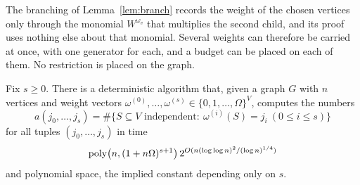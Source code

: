 The branching of Lemma~\ref{lem:branch} records the weight of the chosen
vertices only through the monomial $W^{\omega_v}$ that multiplies the second
child, and its proof uses nothing else about that monomial. Several weights can
therefore be carried at once, with one generator for each, and a budget can be
placed on each of them. No restriction is placed on the graph.

\begin{theorem}\label{thm:indepbudget}
Fix $s\ge0$. There is a deterministic algorithm that, given a graph $G$ with $n$
vertices and weight vectors $\omega^{(0)},\dots,\omega^{(s)}\in\{0,1,\dots,\Omega\}^{V}$,
computes the numbers
\[
  a(j_0,\dots,j_s)=\#\bigl\{S\subseteq V\text{ independent}:\ \omega^{(i)}(S)=j_i\ (0\le i\le s)\bigr\}
\]
for all tuples $(j_0,\dots,j_s)$ in time
\[
  \operatorname{poly}\bigl(n,(1+n\Omega)^{s+1}\bigr)\,2^{O(n(\log\log n)^2/(\log n)^{1/4})}
\]
and polynomial space, the implied constant depending only on $s$.
\end{theorem}

